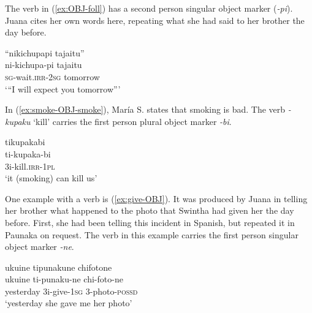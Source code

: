 The verb in (\ref{ex:OBJ-foll}) has a second person singular object marker (\textit{-pi}). Juana cites her own words here, repeating what she had said to her brother the day before. %

\ea\label{ex:OBJ-foll}
\begingl 
\glpreamble “nikichupapi tajaitu”\\
\gla ni-kichupa-pi tajaitu\\ 
\textsc{sg}-wait.\textsc{irr}-2\textsc{sg} tomorrow\\ 
\glft ‘“I will expect you tomorrow”’\\ 
\endgl
\trailingcitation{[jxx-p120430l-1.127]}
\xe

In (\ref{ex:smoke-OBJ-smoke}), María S. states that smoking is bad. The verb \textit{-kupaku} ‘kill’ carries the first person plural object marker \textit{-bi}.

\ea\label{ex:smoke-OBJ-smoke}
\begingl
\glpreamble tikupakabi\\
\gla ti-kupaka-bi\\
\glb 3i-kill.\textsc{irr}-1\textsc{pl}\\
\glft ‘it (smoking) can kill us’
\endgl
\trailingcitation{[rxx-e120511l.385]}
\xe

%

One example with a  verb is (\ref{ex:give-OBJ}). It was produced by Juana in telling her brother what happened to the photo that Swintha had given her the day before. First, she had been telling this incident in Spanish, but repeated it in Paunaka on request. The verb in this example carries the first person singular object marker \textit{-ne}.

\ea\label{ex:give-OBJ}
\begingl 
\glpreamble ukuine tipunakune chifotone\\
\gla ukuine ti-punaku-ne chi-foto-ne\\ 
\glb yesterday 3i-give-1\textsc{sg} 3-photo-\textsc{possd}\\ 
\glft ‘yesterday she gave me her photo’\\ 
\endgl
\trailingcitation{[jmx-e090727s.041]}
\xe


